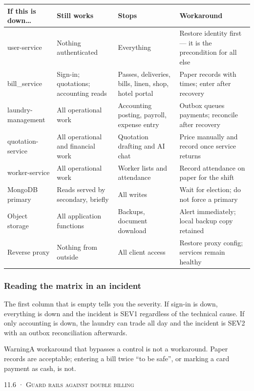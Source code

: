 \documentclass[11pt,a4paper,oneside]{book}
\begin{document}
\begin{center}\small
\begin{tabularx}{\linewidth}{|X|X|X|X|}
\hline
\rowcolor{lightgrey}
\textbf{If this is down…} & \textbf{Still works} & \textbf{Stops} & \textbf{Workaround} \\ \hline
user-service & Nothing authenticated & Everything & Restore identity first — it is the precondition for all else \\ \hline
bill\_service & Sign-in; quotations; accounting reads & Passes, deliveries, bills, linen, shop, hotel portal & Paper records with times; enter after recovery \\ \hline
laundry-management & All operational work & Accounting posting, payroll, expense entry & Outbox queues payments; reconcile after recovery \\ \hline
quotation-service & All operational and financial work & Quotation drafting and AI chat & Price manually and record once service returns \\ \hline
worker-service & All operational work & Worker lists and attendance & Record attendance on paper for the shift \\ \hline
MongoDB primary & Reads served by secondary, briefly & All writes & Wait for election; do not force a primary \\ \hline
Object storage & All application functions & Backups, document download & Alert immediately; local backup copy retained \\ \hline
Reverse proxy & Nothing from outside & All client access & Restore proxy config; services remain healthy \\ \hline
\end{tabularx}
\end{center}
\subsubsection*{Reading the matrix in an incident}
The first column that is empty tells you the severity. If sign-in is down, everything is down and the incident is SEV1 regardless of the technical cause. If only accounting is down, the laundry can trade all day and the incident is SEV2 with an outbox reconciliation afterwards.

\begin{notebox}WarningA workaround that bypasses a control is not a workaround. Paper records are acceptable; entering a bill twice “to be safe”, or marking a card payment as cash, is not.\end{notebox}
\textsc{\small\color{crimson}11.6 · Guard rails against double billing}\par\medskip
\end{document}
